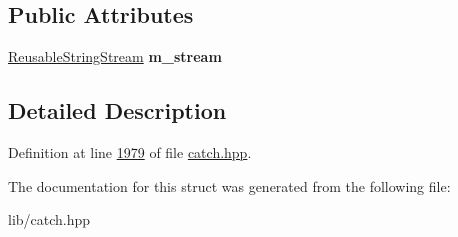 \subsection*{Public Attributes}
\begin{DoxyCompactItemize}
\item 
\mbox{\label{structCatch_1_1MessageStream_a9202520faed8882ef469db9f353ec578}} 
\mbox{\hyperlink{classCatch_1_1ReusableStringStream}{Reusable\+String\+Stream}} {\bfseries m\+\_\+stream}
\end{DoxyCompactItemize}


\subsection{Detailed Description}


Definition at line \mbox{\hyperlink{catch_8hpp_source_l01979}{1979}} of file \mbox{\hyperlink{catch_8hpp_source}{catch.\+hpp}}.



The documentation for this struct was generated from the following file\+:\begin{DoxyCompactItemize}
\item 
lib/catch.\+hpp\end{DoxyCompactItemize}
